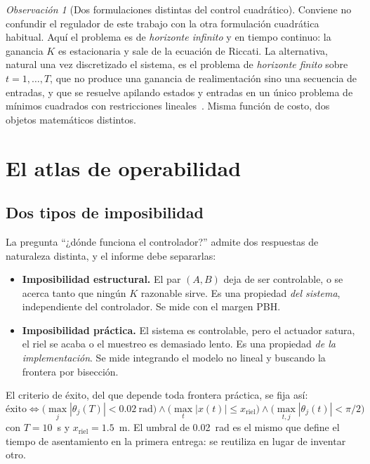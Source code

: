 \documentclass[11pt,letterpaper]{article}
\theoremstyle{definition}
\theoremstyle{plain}
\theoremstyle{remark}
\newtheorem{observacion}[definicion]{Observación}
\begin{document}
\begin{observacion}[Dos formulaciones distintas del control cuadrático]
Conviene no confundir el regulador de este trabajo con la otra formulación
cuadrática habitual. Aquí el problema es de \emph{horizonte infinito} y en
tiempo continuo: la ganancia $K$ es estacionaria y sale de la ecuación de
Riccati. La alternativa, natural una vez discretizado el sistema, es el problema
de \emph{horizonte finito} sobre $t=1,\dots,T$, que no produce una ganancia de
realimentación sino una secuencia de entradas, y que se resuelve apilando
estados y entradas en un único problema de mínimos cuadrados con restricciones
lineales~\cite[\S17.2]{boyd2018}. Misma función de costo, dos objetos
matemáticos distintos.
\end{observacion}

\section{El atlas de operabilidad}
\label{sec:atlas}

\subsection{Dos tipos de imposibilidad}

La pregunta ``¿dónde funciona el controlador?'' admite dos respuestas de
naturaleza distinta, y el informe debe separarlas:

\begin{itemize}
  \item \textbf{Imposibilidad estructural.} El par $(A,B)$ deja de ser
  controlable, o se acerca tanto que ningún $K$ razonable sirve. Es una
  propiedad \emph{del sistema}, independiente del controlador. Se mide con el
  margen PBH.
  \item \textbf{Imposibilidad práctica.} El sistema es controlable, pero el
  actuador satura, el riel se acaba o el muestreo es demasiado lento. Es una
  propiedad \emph{de la implementación}. Se mide integrando el modelo no lineal
  y buscando la frontera por bisección.
\end{itemize}

El criterio de éxito, del que depende toda frontera práctica, se fija así:
\[
\text{éxito}\iff\Big(\max_j|\theta_j(T)|<0.02\ \text{rad}\Big)\wedge\Big(\max_t|x(t)|\le x_{\text{riel}}\Big)\wedge\Big(\max_{t,j}|\theta_j(t)|<\pi/2\Big)
\]
con $T=10$~s y $x_{\text{riel}}=1.5$~m. El umbral de 0.02~rad es el mismo que
define el tiempo de asentamiento en la primera entrega: se reutiliza en lugar de
inventar otro.
\end{document}

